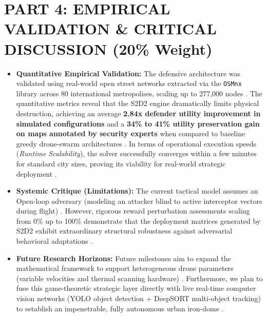 \documentclass[11pt,a4paper]{article}
\begin{document}
\section{PART 4: EMPIRICAL VALIDATION \& CRITICAL DISCUSSION (20\% Weight)}

\begin{itemize}
    \item \textbf{Quantitative Empirical Validation:} The defensive architecture was validated using real-world open street networks extracted via the \texttt{OSMnx} library \cite{boeing2017osmnx} across 80 international metropolises, scaling up to 277,000 nodes \cite{mutzari2025defending}. The quantitative metrics reveal that the S2D2 engine dramatically limits physical destruction, achieving an average \textbf{2.84x defender utility improvement in simulated configurations} and a \textbf{34\% to 41\% utility preservation gain on maps annotated by security experts} when compared to baseline greedy drone-swarm architectures \cite{mutzari2025defending}. In terms of operational execution speeds (\textit{Runtime Scalability}), the solver successfully converges within a few minutes for standard city sizes, proving its viability for real-world strategic deployment \cite{mutzari2025defending}.
    \item \textbf{Systemic Critique (Limitations):} The current tactical model assumes an Open-loop adversary (modeling an attacker blind to active interceptor vectors during flight) \cite{mutzari2025defending}. However, rigorous reward perturbation assessments scaling from 0\% up to 100\% demonstrate that the deployment matrices generated by S2D2 exhibit extraordinary structural robustness against adversarial behavioral adaptations \cite{mutzari2025defending}.
    \item \textbf{Future Research Horizons:} Future milestones aim to expand the mathematical framework to support heterogeneous drone parameters (variable velocities and thermal scanning hardware) \cite{mutzari2025defending}. Furthermore, we plan to fuse this game-theoretic strategic layer directly with live real-time computer vision networks (YOLO object detection + DeepSORT multi-object tracking) to establish an impenetrable, fully autonomous urban iron-dome \cite{mutzari2025defending}.
\end{itemize}

\newpage


\end{document}
